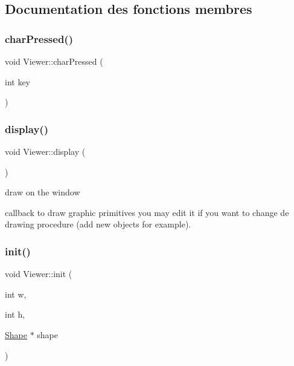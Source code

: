 \subsection{Documentation des fonctions membres}
\mbox{\label{class_viewer_a12155081915ec2fcf3554534b8aa52d6}} 
\subsubsection{\texorpdfstring{char\+Pressed()}{charPressed()}}
{\footnotesize\ttfamily void Viewer\+::char\+Pressed (\begin{DoxyParamCaption}\item[{int}]{key }\end{DoxyParamCaption})}

\mbox{\label{class_viewer_a277a934adb86150b09d044b7cee822f8}} 
\subsubsection{\texorpdfstring{display()}{display()}}
{\footnotesize\ttfamily void Viewer\+::display (\begin{DoxyParamCaption}{ }\end{DoxyParamCaption})}



draw on the window 

callback to draw graphic primitives you may edit it if you want to change de drawing procedure (add new objects for example). \mbox{\label{class_viewer_a2d57e05f6d9c450431e01ffd82eb3b5e}} 
\subsubsection{\texorpdfstring{init()}{init()}}
{\footnotesize\ttfamily void Viewer\+::init (\begin{DoxyParamCaption}\item[{int}]{w,  }\item[{int}]{h,  }\item[{\hyperlink{class_shape}{Shape} $\ast$}]{shape }\end{DoxyParamCaption})}



